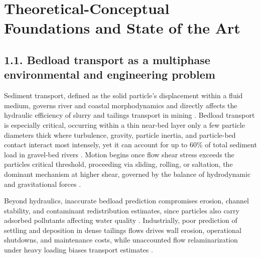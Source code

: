 \hypertarget{theoretical-conceptual-foundations-and-state-of-the-art}{%
\section{Theoretical-Conceptual Foundations and State of the Art}\label{theoretical-conceptual-foundations-and-state-of-the-art}}

\subsection{1.1. Bedload transport as a multiphase environmental and engineering problem}

Sediment transport, defined as the solid particle's displacement within a fluid medium, governs river and coastal morphodynamics and directly affects the hydraulic efficiency of slurry and tailings transport in mining \cite{PEND_Kaushal2002,PEND_Kaushal2012,PEND_Mesa2021,vreman__2015}. Bedload transport is especially critical, occurring within a thin near-bed layer only a few particle diameters thick where turbulence, gravity, particle inertia, and particle-bed contact interact most intensely, yet it can account for up to 60\% of total sediment load in gravel-bed rivers \cite{garcia__2008,PEND_Nio1996,vanrijn__1984,PEND_Zhao2020}. Motion begins once flow shear stress exceeds the particles\textquotesingle{} critical threshold, proceeding via sliding, rolling, or saltation, the dominant mechanism at higher shear, governed by the balance of hydrodynamic and gravitational forces \cite{garcia__2008,PEND_Hu1996,julien__2010,PEND_Lee1994,moreno-casas__2022,PEND_Nio1994,PEND_Nio1998}.

Beyond hydraulics, inaccurate bedload prediction compromises erosion, channel stability, and contaminant redistribution estimates, since particles also carry adsorbed pollutants affecting water quality \cite{PEND_Bustamante2020,PEND_Gonzlez2008,walling__2006}. Industrially, poor prediction of settling and deposition in dense tailings flows drives wall erosion, operational shutdowns, and maintenance costs, while unaccounted flow relaminarization under heavy loading biases transport estimates \cite{elghobashi__1994,gore__1989,PEND_Islam2024,PEND_Mesa2021,zhou__2020}.

